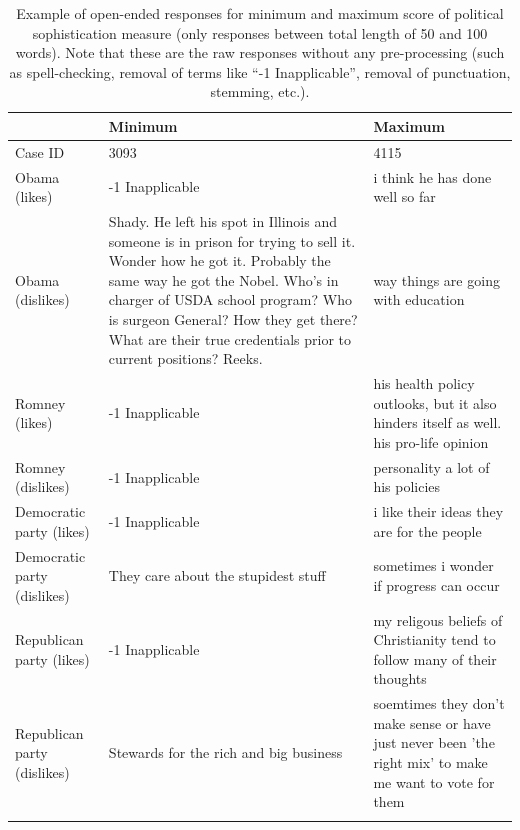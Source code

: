 \documentclass[12pt]{article}
\begin{document}
\begin{longtable}[ht]{p{4cm}p{6cm}p{6cm}}
   \hline
  & Minimum & Maximum \\ 
   \hline
 Case ID & 3093 & 4115 \\ 
   Obama (likes) & -1 Inapplicable & i think he has done well so far \\ 
   Obama (dislikes) & Shady. He left his spot in Illinois and someone is in prison for trying to sell it. Wonder how he got it. Probably the same way he got the Nobel. Who's in charger of USDA school program? Who is surgeon General? How they get there? What are their true credentials prior to current positions? Reeks. & way things are going with education \\ 
   Romney (likes) & -1 Inapplicable & his health policy outlooks, but it also hinders itself as well. his pro-life opinion \\ 
   Romney (dislikes) & -1 Inapplicable & personality a lot of his policies \\ 
   Democratic party (likes) & -1 Inapplicable & i like their ideas they are for the people \\ 
   Democratic party (dislikes) & They care about the stupidest stuff & sometimes i wonder if progress can occur \\ 
   Republican party (likes) & -1 Inapplicable & my religous beliefs of Christianity tend to follow many of their thoughts \\ 
   Republican party (dislikes) & Stewards for the rich and big business & soemtimes they don't make sense or have just never been 'the right mix' to make me want to vote for them \\ 
    \hline
  \caption{Example of open-ended responses for minimum and maximum score of political sophistication measure (only responses between total length of 50 and 100 words). Note that these are the raw responses without any pre-processing (such as spell-checking, removal of terms like ``-1 Inapplicable'', removal of punctuation, stemming, etc.).}
  \label{tab:ex1}
\end{longtable}
\end{document}
